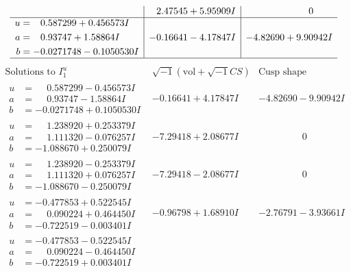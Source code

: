 \documentclass[1p]{elsarticle_modified}
\theoremstyle{definition}
\newcommand{\I}{\sqrt{-1}}
\begin{document}
$$\begin{array}{c|c|c}
 & \phantom{-}2.47545 + 5.95909 I & \phantom{-0.000000 } 0 \\ \hline\begin{aligned}
u &= \phantom{-}0.587299 + 0.456573 I \\
a &= \phantom{-}0.93747 + 1.58864 I \\
b &= -0.0271748 - 0.1050530 I\end{aligned}
 & -0.16641 - 4.17847 I & -4.82690 + 9.90942 I\\
 \hline 
 \end{array}$$\newpage$$\begin{array}{c|c|c}  
\text{Solutions to }I^u_{1}& \I (\text{vol} + \sqrt{-1}CS) & \text{Cusp shape}\\
 \hline 
\begin{aligned}
u &= \phantom{-}0.587299 - 0.456573 I \\
a &= \phantom{-}0.93747 - 1.58864 I \\
b &= -0.0271748 + 0.1050530 I\end{aligned}
 & -0.16641 + 4.17847 I & -4.82690 - 9.90942 I \\ \hline\begin{aligned}
u &= \phantom{-}1.238920 + 0.253379 I \\
a &= \phantom{-}1.111320 - 0.076257 I \\
b &= -1.088670 + 0.250079 I\end{aligned}
 & -7.29418 + 2.08677 I & \phantom{-0.000000 } 0 \\ \hline\begin{aligned}
u &= \phantom{-}1.238920 - 0.253379 I \\
a &= \phantom{-}1.111320 + 0.076257 I \\
b &= -1.088670 - 0.250079 I\end{aligned}
 & -7.29418 - 2.08677 I & \phantom{-0.000000 } 0 \\ \hline\begin{aligned}
u &= -0.477853 + 0.522545 I \\
a &= \phantom{-}0.090224 + 0.464450 I \\
b &= -0.722519 - 0.003401 I\end{aligned}
 & -0.96798 + 1.68910 I & -2.76791 - 3.93661 I \\ \hline\begin{aligned}
u &= -0.477853 - 0.522545 I \\
a &= \phantom{-}0.090224 - 0.464450 I \\
b &= -0.722519 + 0.003401 I\end{aligned}

\end{array}$$
\end{document}
